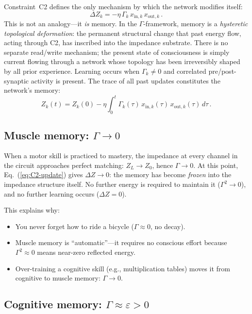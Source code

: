 \documentclass[aps,pre,twocolumn,superscriptaddress,floatfix]{revtex4-2}
\begin{document}
Constraint~C2 defines the only mechanism by which the network
modifies itself:
\begin{equation}
  \Delta Z_k = -\eta\,\Gamma_k\,x_{\text{in},k}\,x_{\text{out},k}\,.
  \label{eq:C2-update}
\end{equation}
This is not an analogy---it \emph{is} memory.
In the $\Gamma$-framework, memory is a
\emph{hysteretic topological deformation}: the
permanent structural change that past energy flow,
acting through C2, has inscribed into the impedance
substrate.
There is no separate read/write mechanism;
the present state of consciousness is simply
current flowing through a network whose topology
has been irreversibly shaped by all prior experience.
Learning occurs when $\Gamma_k\neq 0$ and correlated
pre/post-synaptic activity is present.
The trace of all past updates constitutes the network's
memory:
\begin{equation}
  Z_k(t) = Z_k(0) - \eta \int_0^t
    \Gamma_k(\tau)\,x_{\text{in},k}(\tau)\,
    x_{\text{out},k}(\tau)\,d\tau\,.
  \label{eq:memory-integral}
\end{equation}

\subsection{Muscle memory: $\Gamma\to 0$}

When a motor skill is practiced to mastery, the impedance at
every channel in the circuit approaches perfect matching:
$Z_L\to Z_0$, hence $\Gamma\to 0$.
At this point, Eq.~(\ref{eq:C2-update}) gives $\Delta Z\to 0$:
the memory has become \emph{frozen} into the impedance
structure itself.
No further energy is required to maintain it ($\Gamma^2\to 0$),
and no further learning occurs ($\Delta Z=0$).

This explains why:
\begin{itemize}
  \item You never forget how to ride a bicycle
    ($\Gamma\approx 0$, no decay).
  \item Muscle memory is ``automatic''---it requires no
    conscious effort because $\Gamma^2\approx 0$ means
    near-zero reflected energy.
  \item Over-training a cognitive skill (e.g., multiplication
    tables) moves it from cognitive to muscle memory:
    $\Gamma\to 0$.
\end{itemize}

\subsection{Cognitive memory: $\Gamma\approx\varepsilon>0$}
\end{document}
